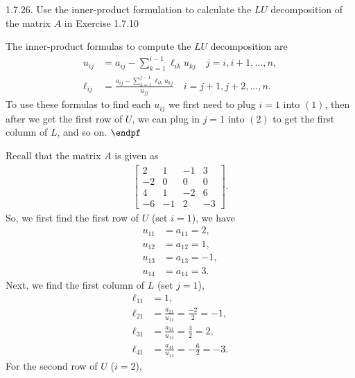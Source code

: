 \documentclass{report}
\begin{document}
    \bigbreak \noindent 
    \begin{mdframed}
        1.7.26. Use the inner-product formulation to calculate the $LU$ decomposition of the matrix $A$ in Exercise 1.7.10 
    \end{mdframed}
    \bigbreak \noindent 
    \begin{remark}
        The inner-product formulas to compute the $LU$ decomposition are  
        \begin{align*}
            u_{ij} &= a_{ij} - \sum_{k=1}^{i-1}\ell_{ik}u_{kj} \quad j=i,i+1,...,n \tag{1}, \\
            \ell_{ij} &= \frac{a_{ij} - \sum_{k=1}^{j-1}\ell_{ik}u_{kj}}{u_{jj}} \quad i=j+1,j+2,...,n \tag{2}
        .\end{align*}
        \bigbreak \noindent 
        To use these formulas to find each $u_{ij}$ we first need to plug $i=1$ into $(1)$, then after we get the first row of $U$, we can plug in $j=1$ into $(2)$ to get the first column of $L$, and so on. $\endpf $
    \end{remark}
    \bigbreak \noindent 
    Recall that the matrix $A$ is given as
    \begin{align*}
        \begin{bmatrix}
            2 & 1 & -1 & 3 \\
            -2 & 0 & 0 & 0 \\
            4 & 1 & -2 & 6 \\
            -6 & -1 & 2 & -3
       \end{bmatrix} 
    .\end{align*}
    So, we first find the first row of $U$ (set $i=1$), we have
    \begin{align*}
        u_{11} &= a_{11} =  2, \\
        u_{12} &= a_{12} = 1 , \\
        u_{13} &= a_{13} = -1, \\
        u_{14} &= a_{14} = 3
    .\end{align*}
    Next, we find the first column of $L$ (set $j=1$),
    \begin{align*}
        \ell_{11} &= 1, \\
        \ell_{21} &= \frac{a_{21}}{u_{11}} = \frac{-2}{2} = -1, \\
        \ell_{31} &= \frac{a_{31}}{u_{11}} = \frac{4}{2} = 2,\\
        \ell_{41} &= \frac{a_{41}}{u_{11}} = -\frac{6}{2} = -3
    .\end{align*}
    For the second row of $U$ ($i = 2$), 
\end{document}
